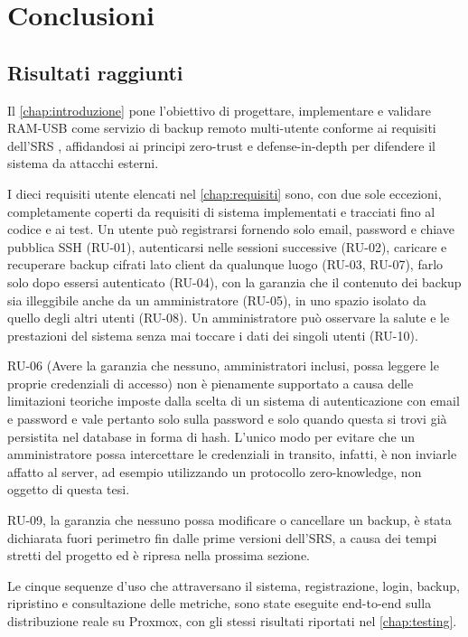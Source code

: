 \chapter{Conclusioni}
\label{chap:conclusioni}

\section{Risultati raggiunti}

Il \autoref{chap:introduzione} pone l'obiettivo di progettare, implementare e validare RAM-USB come
servizio di backup remoto multi-utente conforme ai requisiti dell'SRS \cite{ramusb-srs}, affidandosi ai
principi zero-trust e defense-in-depth per difendere il sistema da attacchi esterni. 

I dieci requisiti utente elencati nel \autoref{chap:requisiti} sono, con due sole eccezioni, completamente 
coperti da 
requisiti di sistema implementati e tracciati fino al codice e ai test. Un utente può registrarsi fornendo 
solo email, password e chiave pubblica SSH (RU-01), autenticarsi nelle sessioni successive (RU-02), 
caricare e recuperare backup cifrati lato client da qualunque luogo (RU-03, RU-07), farlo solo dopo essersi 
autenticato (RU-04), con la garanzia che il contenuto dei backup sia illeggibile anche da 
un amministratore (RU-05), in uno spazio isolato da quello degli altri utenti (RU-08). 
Un amministratore può osservare la salute e le prestazioni del sistema senza mai toccare i dati dei singoli 
utenti (RU-10).

RU-06 (Avere la garanzia che nessuno, amministratori inclusi, possa leggere le proprie credenziali di
accesso) non è pienamente supportato a causa delle limitazioni teoriche imposte dalla scelta di un sistema 
di autenticazione con email e password e vale pertanto solo sulla password e solo quando questa si trovi già 
persistita nel database in forma di hash. L'unico modo per evitare che un amministratore possa intercettare 
le credenziali in transito, infatti, è non inviarle affatto al server, ad esempio utilizzando un protocollo 
zero-knowledge, non oggetto di questa tesi.

RU-09, la garanzia che nessuno possa modificare o cancellare un backup, è stata
dichiarata fuori perimetro fin dalle prime versioni dell'SRS, a causa dei tempi stretti del progetto ed è 
ripresa nella prossima sezione.

Le cinque sequenze d'uso che attraversano il sistema, registrazione, login, backup, ripristino e
consultazione delle metriche, sono state eseguite end-to-end sulla distribuzione reale su Proxmox, con gli
stessi risultati riportati nel \autoref{chap:testing}.

